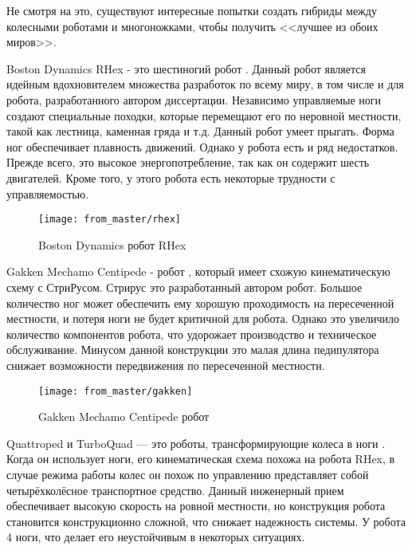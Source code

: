 Не смотря на это, существуют интересные попытки создать гибриды между колесными роботами и многоножками, чтобы получить <<лучшее из обоих миров>>.

Boston Dynamics RHex \cite{Altendorfer2001} - это шестиногий робот . Данный робот является идейным вдохновителем множества разработок по всему миру, в том числе и для робота, разработанного автором диссертации. Независимо управляемые ноги создают специальные походки, которые перемещают его по неровной местности, такой как лестница, каменная гряда и т.д. Данный робот умеет прыгать. Форма ног обеспечивает плавность движений. Однако у робота есть и ряд недостатков. Прежде всего, это высокое энергопотребление, так как он содержит шесть двигателей. Кроме того, у этого робота есть некоторые трудности с управляемостью. 

\begin{figure}[H]
    \centering\texttt{[image: from\_master/rhex]}\\
    \caption{Boston Dynamics робот RHex}
    \label{fig:rhex}
    \end{figure}

Gakken Mechamo Centipede \cite{millerExtremeMakeoverHeianera2008, Miller2019} - робот , который имеет схожую кинематическую схему с СтриРусом. Стрирус это разработанный автором робот. Большое количество ног может обеспечить ему хорошую проходимость на пересеченной местности, и потеря ноги не будет критичной для робота. Однако это увеличило количество компонентов робота, что удорожает производство и техническое обслуживание. Минусом данной конструкции это малая длина педипулятора снижает возможности передвижения по пересеченной местности.
\begin{figure}[H]
    \centering\texttt{[image: from\_master/gakken]}\\
    \caption{Gakken Mechamo Centipede робот}
    \label{fig:gakken}
    \end{figure}

Quattroped и TurboQuad \cite{shenDesignLegwheelHybrid2009, Chen2014, Chen2017} --- это роботы, трансформирующие колеса в ноги . Когда он использует ноги, его кинематическая схема похожа на робота RHex, в случае режима работы колес он похож по управлению представляет собой четырёхколёсное транспортное средство. Данный инженерный прием обеспечивает высокую скорость на ровной местности, но конструкция робота становится конструкционно сложной, что снижает надежность системы. У робота 4 ноги, что делает его неустойчивым в некоторых ситуациях.


